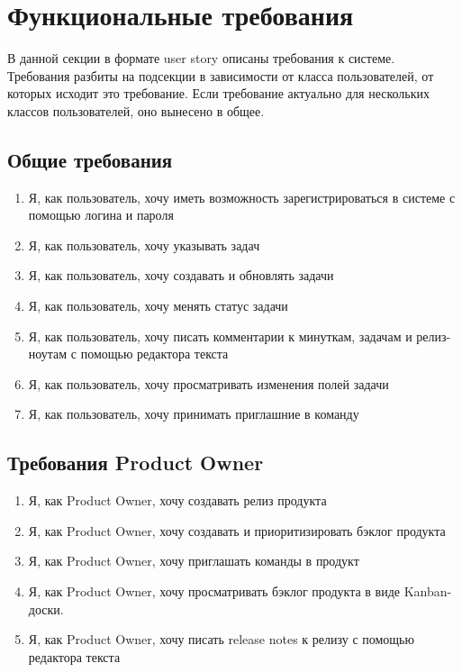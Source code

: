 \section{Функциональные требования}

В данной секции в формате user story описаны требования к системе.
Требования разбиты на подсекции в зависимости от класса пользователей,
от которых исходит это требование.
Если требование актуально для нескольких классов пользователей, оно
вынесено в общее.

\subsection{Общие требования}
\begin{enumerate}[label=\textbf{FR\arabic*}.]
  \item Я, как пользователь, хочу иметь возможность зарегистрироваться в системе с помощью логина и пароля
  \item Я, как пользователь, хочу указывать  задач
  \item Я, как пользователь, хочу создавать и обновлять задачи
  \item Я, как пользователь, хочу менять статус задачи
  \item Я, как пользователь, хочу писать комментарии к минуткам, задачам и релиз-ноутам с помощью редактора текста
  \item Я, как пользователь, хочу просматривать изменения полей задачи
  \item Я, как пользователь, хочу принимать приглашние в команду
\end{enumerate}

\subsection{Требования Product Owner}
\begin{enumerate}[label=\textbf{POR\arabic*}.]
  \item Я, как Product Owner, хочу создавать релиз продукта
  \item Я, как Product Owner, хочу создавать и приоритизировать бэклог продукта
  \item Я, как Product Owner, хочу приглашать команды в продукт
  \item Я, как Product Owner, хочу просматривать бэклог продукта в виде Kanban-доски.
  \item Я, как Product Owner, хочу писать release notes к релизу с помощью редактора текста
\end{enumerate}

